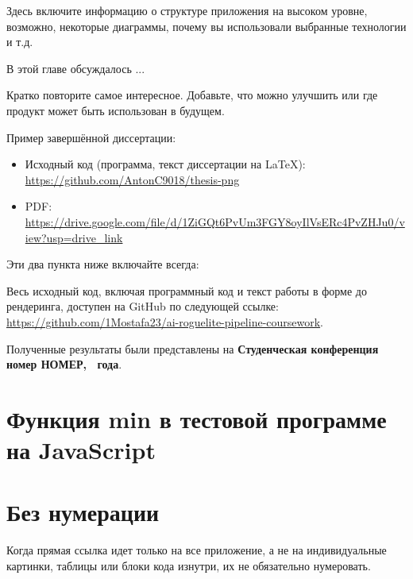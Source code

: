 \documentclass[a4paper,12pt]{report}
\newcommand{\yearOfWriting}{\the\year}
\newcommand{\conferencesList}{Студенческая конференция номер НОМЕР, \yearOfWriting~года}
\newcommand{\github}{\url{https://github.com/1Mostafa23/ai-roguelite-pipeline-coursework}}
\begin{document}
Здесь включите информацию о структуре приложения на высоком уровне,
возможно, некоторые диаграммы, почему вы использовали выбранные технологии и т.д.


В этой главе обсуждалось ...

\finalConclusionChapter

Кратко повторите самое интересное.
Добавьте, что можно улучшить или где продукт может быть использован в будущем.

Пример завершённой диссертации:
\begin{itemize}
  \item Исходный код (программа, текст диссертации на \LaTeX{}): \url{https://github.com/AntonC9018/thesis-png}
  \item PDF: \url{https://drive.google.com/file/d/1ZiGQt6PvUm3FGY8oyIlVsERc4PvZHJu0/view?usp=drive_link}
\end{itemize}

Эти два пункта ниже включайте всегда:

Весь исходный код, включая программный код и текст работы
в форме до рендеринга, доступен на GitHub по следующей ссылке: \github.

Полученные результаты были представлены на \textbf{\conferencesList}\cite{self}.

\bibliographyChapter

\appendixChapter

\section{Функция min в тестовой программе на JavaScript}\label{appendix:example_min}

\section{Без нумерации}\label{unnumbered_appendix}


Когда прямая ссылка идет только на все приложение,
а не на индивидуальные картинки, таблицы или блоки кода изнутри,
их не обязательно нумеровать.

\end{document}
